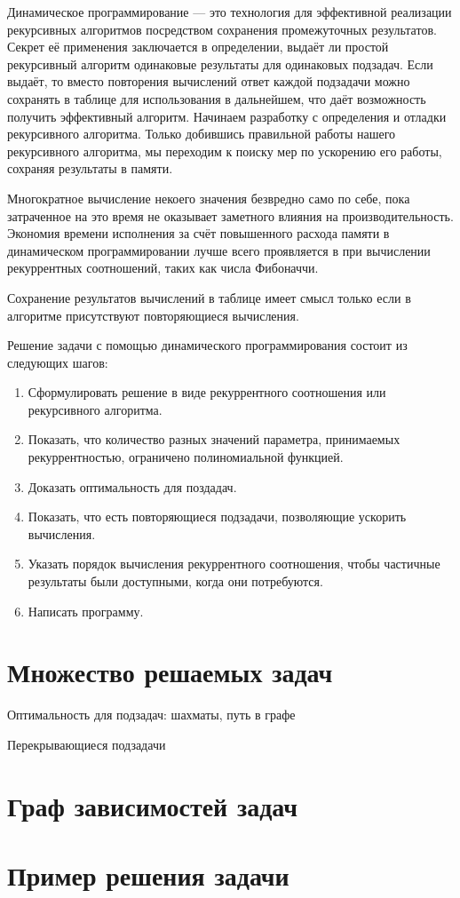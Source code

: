 Динамическое программирование --- это технология для эффективной реализации рекурсивных алгоритмов
посредством сохранения промежуточных результатов. Секрет её применения заключается
в определении, выдаёт ли простой рекурсивный алгоритм одинаковые результаты для одинаковых
подзадач. Если выдаёт, то вместо повторения вычислений ответ каждой подзадачи можно
сохранять в таблице для использования в дальнейшем, что даёт возможность получить эффективный
алгоритм. Начинаем разработку с определения и отладки рекурсивного алгоритма. Только добившись
правильной работы нашего рекурсивного алгоритма, мы переходим к поиску мер по ускорению
его работы, сохраняя результаты в памяти.

Многократное вычисление некоего значения безвредно само по себе, пока затраченное на это время
не оказывает заметного влияния на производительность. Экономия времени исполнения за счёт повышенного
расхода памяти в динамическом программировании лучше всего проявляется в при вычислении
рекуррентных соотношений, таких как числа Фибоначчи.

Сохранение результатов вычислений в таблице имеет смысл только если в алгоритме присутствуют
повторяющиеся вычисления. 

Решение задачи с помощью динамического программирования состоит из следующих шагов:
\begin{enumerate}
\item Сформулировать решение в виде рекуррентного соотношения или рекурсивного алгоритма.
\item Показать, что количество разных значений параметра, принимаемых рекуррентностью,
      ограничено полиномиальной функцией.
\item Доказать оптимальность для поздадач.
\item Показать, что есть повторяющиеся подзадачи, позволяющие ускорить вычисления.
\item Указать порядок вычисления рекуррентного соотношения, чтобы частичные результаты
      были доступными, когда они потребуются.
\item Написать программу.
\end{enumerate}

\section{Множество решаемых задач}

Оптимальность для подзадач: шахматы, путь в графе

Перекрывающиеся подзадачи

\section{Граф зависимостей задач}

\section{Пример решения задачи}
